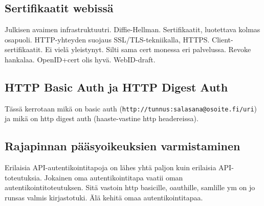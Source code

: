 \documentclass[finnish,gradu]{tktltiki}
\begin{document}




  \subsection{Sertifikaatit webissä} %
  \label{sub:sertifikaatit_webissä}
  Julkisen avaimen infrastruktuutri.
  Diffie-Hellman.
  Sertifikaatit, luotettava kolmas osapuoli.
  HTTP-yhteyden suojaus SSL/TLS-tekniikalla, HTTPS.
  Client-sertifikaatit. Ei vielä yleistynyt. Silti sama cert monessa eri palvelussa. Revoke hankalaa. OpenID+cert olis hyvä.
  WebID-draft.


  \subsection{HTTP Basic Auth ja HTTP Digest Auth} %
  \label{sub:http_basic_auth_ja_http_digest_auth}
  Tässä kerrotaan mikä on basic auth (\verb!http://tunnus:salasana@osoite.fi/uri!) ja mikä on http digest auth (haaste-vastine http headereissa).




  \subsection{Rajapinnan pääsyoikeuksien varmistaminen} %
  \label{sub:rajapintakutsun_pääsyoikeudet}
  Erilaisia API-autentikointitapoja on lähes yhtä paljon kuin erilaisia API-toteutuksia. Jokainen oma autentikointitapa vaatii oman autentikointitoteutuksen. Sitä vastoin http basicille, oauthille, samlille ym on jo runsas valmis kirjastotuki.  Älä kehitä omaa autentikointitapaa.
\end{document}
